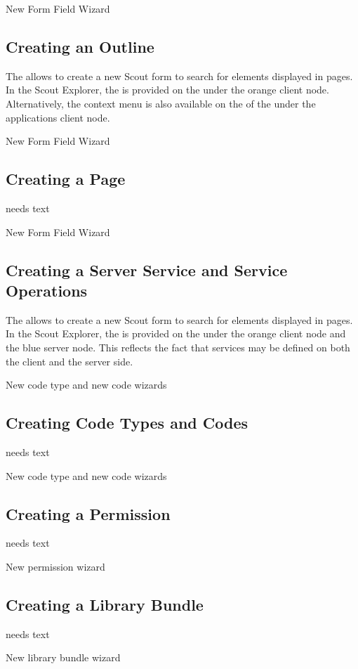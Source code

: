 \documentclass[a4paper,10pt,twoside]{book}
\begin{document}
New Form Field Wizard

\subsection{Creating an Outline}

The  allows to create a new Scout form to search for elements displayed in pages.  
In the Scout Explorer, the  is provided on the  under the orange client node. 
Alternatively, the context menu is also available on the  of the  under the applications client node. 

New Form Field Wizard

\subsection{Creating a Page}
needs text

New Form Field Wizard

\subsection{Creating a Server Service and Service Operations}

The  allows to create a new Scout form to search for elements displayed in pages.  
In the Scout Explorer, the  is provided on the  under the orange client node and the blue server node. 
This reflects the fact that services may be defined on both the client and the server side. 

New code type and new code wizards

\subsection{Creating Code Types and Codes}
needs text

New code type and new code wizards

\subsection{Creating a Permission}
needs text

New permission wizard

\subsection{Creating a Library Bundle}
needs text

New library bundle wizard


\ifx\wholebook\relax\else
   
   
\end{document}
